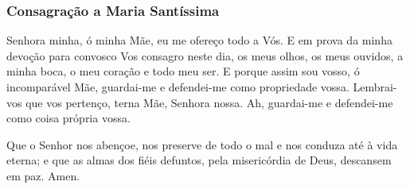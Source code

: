 \subsubsection{Consagração a Maria Santíssima}\label{consagracaodiamaria}

 Senhora minha, ó minha Mãe, eu me ofereço todo a Vós. E em prova da minha devoção para convosco Vos consagro neste dia, os meus olhos, os meus ouvidos, a minha boca, o meu coração e todo meu ser. E porque assim sou vosso, ó incomparável Mãe, guardai-me e defendei-me como propriedade vossa. Lembrai-vos que vos pertenço, terna Mãe, Senhora nossa. Ah, guardai-me e defendei-me como coisa própria vossa.\par
Que o Senhor nos abençoe, nos preserve de todo o mal e nos conduza até à vida eterna; e que as almas dos fiéis defuntos, pela misericórdia de Deus, descansem em paz. Amen. \cruz
